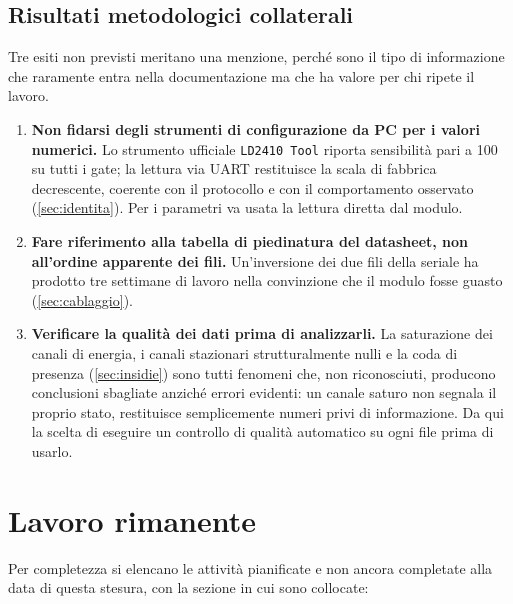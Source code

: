 \subsection{Risultati metodologici collaterali}

Tre esiti non previsti meritano una menzione, perché sono il tipo di informazione
che raramente entra nella documentazione ma che ha valore per chi ripete il lavoro.

\begin{enumerate}[leftmargin=1.8em,itemsep=3pt]
  \item \textbf{Non fidarsi degli strumenti di configurazione da PC per i valori
        numerici.} Lo strumento ufficiale \texttt{LD2410 Tool} riporta sensibilità
        pari a 100 su tutti i gate; la lettura via UART restituisce la scala di
        fabbrica decrescente, coerente con il protocollo e con il comportamento
        osservato (\cref{sec:identita}). Per i parametri va usata la lettura diretta
        dal modulo.
  \item \textbf{Fare riferimento alla tabella di piedinatura del datasheet, non
        all'ordine apparente dei fili.} Un'inversione dei due fili della seriale ha
        prodotto tre settimane di lavoro nella convinzione che il modulo fosse
        guasto (\cref{sec:cablaggio}).
  \item \textbf{Verificare la qualità dei dati prima di analizzarli.} La saturazione
        dei canali di energia, i canali stazionari strutturalmente nulli e la coda di
        presenza (\cref{sec:insidie}) sono tutti fenomeni che, non riconosciuti,
        producono conclusioni sbagliate anziché errori evidenti: un canale saturo non
        segnala il proprio stato, restituisce semplicemente numeri privi di
        informazione. Da qui la scelta di eseguire un controllo di qualità
        automatico su ogni file prima di usarlo.
\end{enumerate}

\section{Lavoro rimanente}

Per completezza si elencano le attività pianificate e non ancora completate alla
data di questa stesura, con la sezione in cui sono collocate:

